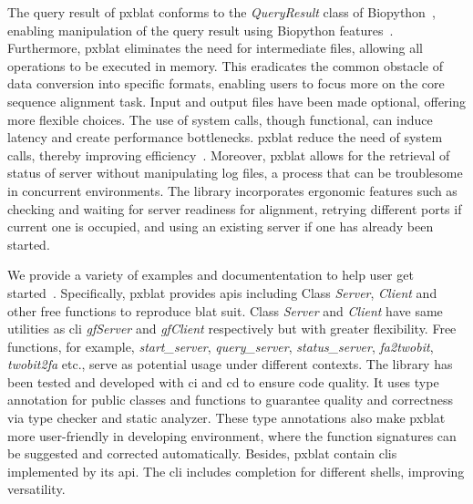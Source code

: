 The query result of \gls{pxblat} conforms to the \emph{QueryResult} class of Biopython~\citep{cock209biopython}, enabling  manipulation of the query result using Biopython features~.
Furthermore, \gls{pxblat} eliminates the need for intermediate files, allowing all operations to be executed in memory.
This eradicates the common obstacle of data conversion into specific formats, enabling users to focus more on the core sequence alignment task.
Input and output files have been made optional, offering more flexible choices.
The use of system calls, though functional, can induce latency and create performance bottlenecks.
\gls{pxblat} reduce the need of system calls, thereby improving efficiency~.
Moreover, \gls{pxblat} allows for the retrieval of status of server without manipulating log files, a process that can be troublesome in concurrent environments.
The library incorporates ergonomic features such as checking and waiting for server readiness for alignment, retrying different ports if current one is occupied, and using an existing server if one has already been started.

We provide a variety of examples and documententation to help user get started~.
Specifically, \gls{pxblat} provides \glspl{api} including Class \emph{Server}, \emph{Client} and other free functions to reproduce \gls{blat} suit.
Class \emph{Server} and \emph{Client} have same utilities as \gls{cli} \emph{gfServer} and \emph{gfClient} respectively but with greater flexibility.
Free functions, for example, \emph{start\_server}, \emph{query\_server}, \emph{status\_server}, \emph{fa2twobit}, \emph{twobit2fa} etc., serve as potential usage under different contexts.
The library has been tested and developed with \gls{ci} and \gls{cd} to ensure code quality.
It uses type annotation for public classes and functions to guarantee quality and correctness via type checker and static analyzer.
These type annotations also make \gls{pxblat} more user-friendly in developing environment, where the function signatures can be suggested and corrected automatically.
Besides, \gls{pxblat} contain \glspl{cli} implemented by its \gls{api}.
The \gls{cli} includes completion for different shells, improving versatility.

\begin{listing}
	\inputminted[linenos, breaklines]{python}{codes/example1.py}
	\label{listing:example}
\end{listing}


